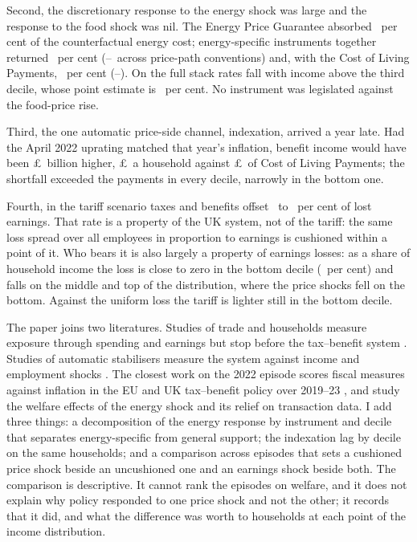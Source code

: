 Second, the discretionary response to the energy shock was large and
the response to the food shock was nil. The Energy Price Guarantee
absorbed \SsEpgRatePct\ per cent of the counterfactual energy cost;
energy-specific instruments together returned
\SsEnergySpecificRatePct\ per cent
(\SsEnergySpecificRateMinPct--\SsEnergySpecificRateMaxPct\ across
price-path conventions) and, with the Cost of Living Payments,
\SsDiscretionaryRatePct\ per cent
(\SsFullRateMinPct--\SsFullRateMaxPct). On the full stack rates fall with
income above the third decile, whose point estimate is
\SsGridPaperFullMaxDecilePct\ per cent. No instrument was legislated
against the food-price rise.

Third, the one automatic price-side channel, indexation, arrived a
year late. Had the April 2022 uprating matched that year's inflation,
benefit income would have been \pounds\SsLagReformBn\ billion higher,
\pounds\SsLagDecAllGbp\ a household against \pounds\SsLagDecAllColGbp\
of Cost of Living Payments; the shortfall exceeded the payments in
every decile, narrowly in the bottom one.

Fourth, in the tariff scenario taxes and benefits offset
\EThreeDispTaxBenRatePct\ to \EThreeWageTaxBenRatePct\ per cent of
lost earnings. That rate is a property of the UK system, not of the
tariff: the same loss spread over all employees in proportion to earnings is cushioned
within a point of it. Who bears it is also largely a property of
earnings losses: as a share of household income the loss is close to
zero in the bottom decile (\EThreeDispSharePctDecOne\ per cent) and
falls on the middle and top of the distribution, where the price
shocks fell on the bottom. Against the uniform loss the tariff is
lighter still in the bottom decile.

The paper joins two literatures. Studies of trade and households
measure exposure through spending and earnings but stop before the
tax--benefit system \citep{porto2006, fajgelbaumkhandelwal2016}.
Studies of automatic stabilisers measure the system against income
and employment shocks \citep{dolls2012, brewertasseva2021}. The
closest work on the 2022 episode scores fiscal measures against
inflation in the EU \citep{amores2025} and UK tax--benefit policy over
2019--23 \citep{popova2026}, and \citet{levell2025} study the welfare
effects of the energy shock and its relief on transaction data. I add
three things: a decomposition of the energy response by instrument
and decile that separates energy-specific from general support; the
indexation lag by decile on the same households; and a comparison
across episodes that sets a cushioned price shock beside an
uncushioned one and an earnings shock beside both. The comparison is
descriptive. It cannot rank the episodes on welfare, and it does not
explain why policy responded to one price shock and not the other; it
records that it did, and what the difference was worth to households
at each point of the income distribution.

